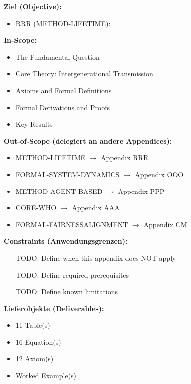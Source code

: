 \begin{tcolorbox}[
    colback=orange!5!white,
    colframe=orange!75!black,
    title={\textbf{Appendix Scope: Ziel / In-Scope / Out-of-Scope / Constraints}},
    fonttitle=\bfseries
]

\textbf{Ziel (Objective):}
\begin{itemize}[nosep]
    \item RRR (METHOD-LIFETIME):
\end{itemize}

\textbf{In-Scope:}
\begin{itemize}[nosep]
    \item The Fundamental Question
    \item Core Theory: Intergenerational Transmission
    \item Axioms and Formal Definitions
    \item Formal Derivations and Proofs
    \item Key Results
\end{itemize}

\textbf{Out-of-Scope (delegiert an andere Appendices):}
\begin{itemize}[nosep]
    \item METHOD-LIFETIME $\rightarrow$ Appendix RRR
    \item FORMAL-SYSTEM-DYNAMICS $\rightarrow$ Appendix OOO
    \item METHOD-AGENT-BASED $\rightarrow$ Appendix PPP
    \item CORE-WHO $\rightarrow$ Appendix AAA
    \item FORMAL-FAIRNESSALIGNMENT $\rightarrow$ Appendix CM
\end{itemize}

\textbf{Constraints (Anwendungsgrenzen):}
\begin{itemize}[nosep]
    \item [TODO: Define when this appendix does NOT apply]
    \item [TODO: Define required prerequisites]
    \item [TODO: Define known limitations]
\end{itemize}

\textbf{Lieferobjekte (Deliverables):}
\begin{itemize}[nosep]
    \item 11 Table(s)
    \item 16 Equation(s)
    \item 12 Axiom(s)
    \item Worked Example(s)
\end{itemize}

\end{tcolorbox}




